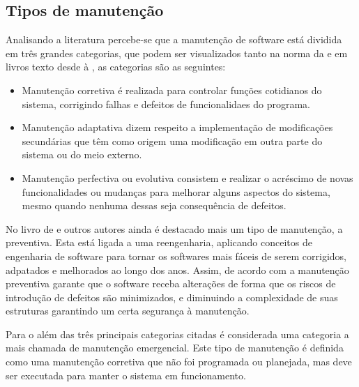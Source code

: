 \subsection{Tipos de manutenção}
\label{sub-tipo-manut}

Analisando a literatura percebe-se que a manutenção de software está dividida em três grandes categorias, que podem ser visualizados tanto na norma da \cite{ieee1219} e em livros texto desde \cite{lientz1980software} à \cite{pfleeger2004engenharia}, as categorias são as seguintes:
\begin{itemize}
\item Manutenção corretiva é realizada para controlar funções cotidianos do sistema, corrigindo falhas e defeitos de funcionalidaes do programa.

\item Manutenção adaptativa dizem respeito a implementação de modificações secundárias que têm como origem uma modificação em outra parte do sistema ou do meio externo.

\item Manutenção perfectiva ou evolutiva consistem e realizar o acréscimo de novas funcionalidades ou mudanças para melhorar alguns aspectos do sistema, mesmo quando nenhuma dessas seja consequência de defeitos.
\end{itemize}

No livro de \cite{pressman2011engenharia} e outros autores ainda é destacado mais um tipo de manutenção, a preventiva. Esta está ligada a uma reengenharia, aplicando conceitos de engenharia de software para tornar os softwares mais fáceis de serem corrigidos, adpatados e melhorados ao longo dos anos. Assim, de acordo com \cite{criscuolo2008qualidade} a manutenção preventiva garante que o software receba alterações de forma que os riscos de introdução de defeitos são minimizados, e diminuindo a complexidade de suas estruturas garantindo um certa segurança à manutenção.


Para o \cite{ieee1219} além das três principais categorias citadas é considerada uma categoria a mais chamada de manutenção emergencial. Este tipo de manutenção é definida como uma manutenção corretiva que não foi programada ou planejada, mas deve ser executada para manter o sistema em funcionamento.
